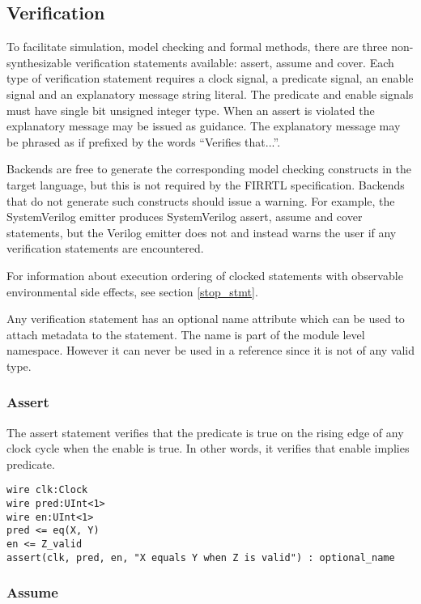 \documentclass[12pt]{article}
\begin{document}
\subsection{Verification}

To facilitate simulation, model checking and formal methods, there are three non-synthesizable verification statements available: assert, assume and cover. Each type of verification statement requires a clock signal, a predicate signal, an enable signal and an explanatory message string literal. The predicate and enable signals must have single bit unsigned integer type. When an assert is violated the explanatory message may be issued as guidance. The explanatory message may be phrased as if prefixed by the words ``Verifies that...''.

Backends are free to generate the corresponding model checking constructs in the target language, but this is not required by the FIRRTL specification. Backends that do not generate such constructs should issue a warning. For example, the SystemVerilog emitter produces SystemVerilog assert, assume and cover statements, but the Verilog emitter does not and instead warns the user if any verification statements are encountered.

For information about execution ordering of clocked statements with observable environmental side
effects, see section \ref{stop_stmt}.

Any verification statement has an optional name attribute which can be used to
attach metadata to the statement. The name is part of the module level
namespace. However it can never be used in a reference since it is not of
any valid type.

\subsubsection{Assert}

The assert statement verifies that the predicate is true on the rising edge of any clock cycle when the enable is true. In other words, it verifies that enable implies predicate.

\begin{lstlisting}
wire clk:Clock
wire pred:UInt<1>
wire en:UInt<1>
pred <= eq(X, Y)
en <= Z_valid
assert(clk, pred, en, "X equals Y when Z is valid") : optional_name
\end{lstlisting}

\subsubsection{Assume}
\end{document}
